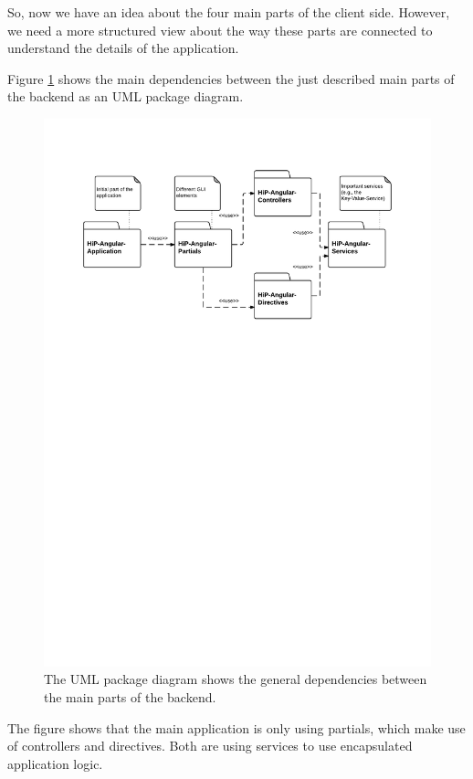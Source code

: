 So, now we have an idea about the four main parts of the client side. 
However, we need a more structured view about the way these parts are connected to understand the details of the application. 

Figure \ref{UML:Packages} shows the main dependencies between the just described main parts of the backend as an \ac{UML} package diagram. 

\begin{figure}[ht]
\centerline{\includegraphics[width=1\textwidth]{gfx/Components_dia}}
\caption{The \ac{UML} package diagram shows the general dependencies between the main parts of the backend.}
\label{UML:Packages}
\end{figure} 

The figure shows that the main application is only using partials, which make use of controllers and directives. Both are using services to use encapsulated application logic.

